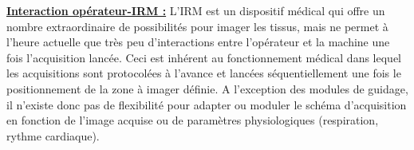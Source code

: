 
\underline{\textbf{Interaction opérateur-IRM :}} L’IRM est un dispositif médical qui offre un nombre extraordinaire de possibilités pour imager les tissus, mais ne permet à l’heure actuelle que très peu d’interactions entre l’opérateur et la machine une fois l’acquisition lancée. Ceci est inhérent au fonctionnement médical dans lequel les acquisitions sont protocolées à l’avance et lancées séquentiellement une fois le positionnement de la zone à imager définie. A l’exception des modules de guidage, il n’existe donc pas de flexibilité pour adapter ou moduler le schéma d’acquisition en fonction de l’image acquise ou de paramètres physiologiques (respiration, rythme cardiaque).\\
